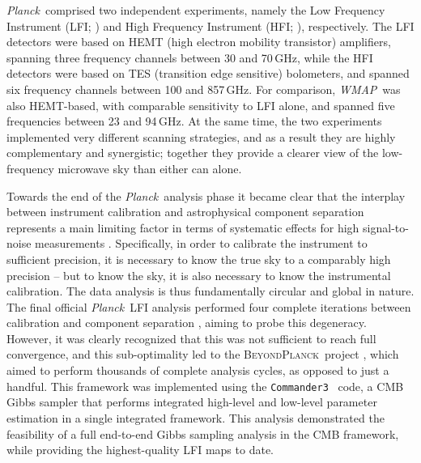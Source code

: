 \documentclass[twocolumn]{../../common/aa}
\def\WMAP{\emph{WMAP}}
\def\COBE{\emph{COBE}}
\def\Planck{\emph{Planck}}
\def\commander{\texttt{Commander}}
\def\commanderthree{\texttt{Commander3}}
\newcommand{\BP}{\textsc{BeyondPlanck}}
\begin{document}
\Planck\ comprised two independent experiments, namely the Low Frequency Instrument (LFI; \citealp{planck2016-l02}) and High Frequency Instrument (HFI; \citealp{planck2016-l03}), respectively. The LFI detectors were based on HEMT (high electron mobility transistor) amplifiers, spanning three frequency channels between 30 and 70\,GHz, while the HFI detectors were based on TES (transition edge sensitive) bolometers, and spanned six frequency channels between 100 and 857\,GHz. For comparison, \WMAP\ was also HEMT-based, with comparable sensitivity to LFI alone, and spanned five frequencies between 23 and 94\,GHz. At the same time, the two experiments implemented very different scanning strategies, and as a result they are highly complementary and synergistic; together they provide a clearer view of the low-frequency microwave sky than either can alone.


Towards the end of the \Planck\ analysis phase it became clear that the interplay between instrument calibration and astrophysical component separation represents a main limiting factor in terms of systematic effects for high signal-to-noise measurements \citep{planck2016-l02}. Specifically, in order to calibrate the instrument to sufficient precision, it is necessary to know the true sky to a comparably high precision -- but to know the sky, it is also necessary to know the instrumental calibration. The data analysis is thus fundamentally circular and global in nature. The final official \Planck\ LFI analysis performed four complete iterations between calibration and component separation \citep{planck2016-l02}, aiming to probe this degeneracy. However, it was clearly recognized that this was not sufficient to reach full convergence, and this sub-optimality led to the \BP\ project \citep{bp01}, which aimed to perform thousands of complete analysis cycles, as opposed to just a handful. This framework was implemented using the \commanderthree\ \citep{bp03} code, a CMB Gibbs sampler that performs integrated high-level and low-level parameter estimation in a single integrated framework. This analysis demonstrated the feasibility of a full end-to-end Gibbs sampling analysis in the CMB framework, while providing the highest-quality LFI maps to date.
\end{document}
